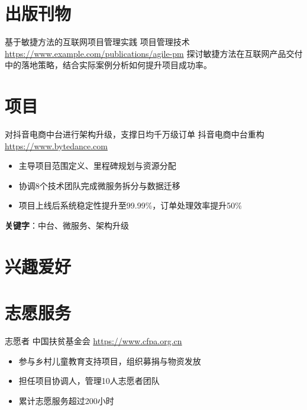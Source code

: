 \documentclass[a4paper, serif, 10pt]{moderncv}
\begin{document}
\section{出版刊物}

        {基于敏捷方法的互联网项目管理实践}
        {项目管理技术}
        {\url{https://www.example.com/publications/agile-pm}}
        {}
        {探讨敏捷方法在互联网产品交付中的落地策略，结合实际案例分析如何提升项目成功率。}
\section{项目}

        {对抖音电商中台进行架构升级，支撑日均千万级订单}
        {抖音电商中台重构}
        {\url{https://www.bytedance.com}}
        {}
        {\begin{itemize}
\item 主导项目范围定义、里程碑规划与资源分配
\item 协调8个技术团队完成微服务拆分与数据迁移
\item 项目上线后系统稳定性提升至99.99\%，订单处理效率提升50\%
\end{itemize}
\textbf{关键字}：中台、微服务、架构升级}
\section{兴趣爱好}

\section{志愿服务}

        {志愿者}
        {中国扶贫基金会}
        {\url{https://www.cfpa.org.cn}}
        {}
        {\begin{itemize}
\item 参与乡村儿童教育支持项目，组织募捐与物资发放
\item 担任项目协调人，管理10人志愿者团队
\item 累计志愿服务超过200小时
\end{itemize}}
    
\end{document}
